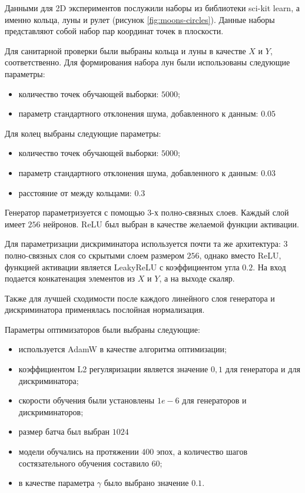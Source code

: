 Данными для 2D экспериментов послужили наборы из библиотеки sci-kit learn, а именно кольца, луны и рулет (рисунок \ref{fig:moons-circles}). Данные наборы представляют собой набор пар координат точек в плоскости.

Для санитарной проверки были выбраны кольца и луны в качестве $X$ и $Y$, соответственно. Для формирования набора лун были использованы следующие параметры:
\begin{itemize}
    \item количество точек обучающей выборки: $5000$;
    \item параметр стандартного отклонения шума, добавленного к данным: $0.05$
\end{itemize}

Для колец выбраны следующие параметры:
\begin{itemize}
    \item количество точек обучающей выборки: $5000$;
    \item параметр стандартного отклонения шума, добавленного к данным: $0.03$
    \item расстояние от между кольцами: $0.3$
\end{itemize}

Генератор параметризуется с помощью $3$-х полно-связных слоев. Каждый слой имеет $256$ нейронов. ReLU был выбран в качестве желаемой функции активации.

Для параметризации дискриминатора используется почти та же архитектура: $3$ полно-связных слоя со скрытыми слоем размером $256$, однако вместо ReLU, функцией активации является LeakyReLU с коэффициентом угла $0.2$. На вход подается конкатенация элементов из $X$ и $Y$, а на выходе скаляр. 

Также для лучшей сходимости после каждого линейного слоя генератора и дискриминатора применялась послойная нормализация.

Параметры оптимизаторов были выбраны следующие: 
\begin{itemize}
    \item используется AdamW в качестве алгоритма оптимизации;
    \item коэффициентом L2 регуляризации является значение $0,1$ для генератора и для дискриминатора;
    \item скорости обучения были установлены $1e-6$ для генераторов и дискриминаторов;
    \item размер батча был выбран $1024$
    \item модели обучались на протяжении $400$ эпох, а количество шагов состязательного обучения составило $60$;
    \item в качестве параметра $\gamma$ было выбрано значение $0.1$.
\end{itemize}

